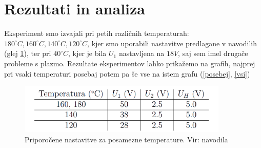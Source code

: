 \documentclass[10pt]{article}
\begin{document}
\section{Rezultati in analiza}

Eksperiment smo izvajali pri petih različnih temperaturah: $180^{\circ}C, 160^{\circ}C, 140^{\circ}C, 120^{\circ}C$, kjer smo uporabili nastavitve predlagane v navodilih (glej \ref{nastavitve}), ter pri $40^{\circ}C$, kjer je bila $U_1$ nastavljena na $18V$, saj sem imel drugače probleme s plazmo. Rezultate eksperimentov lahko prikažemo na grafih, najprej pri vsaki temperaturi posebaj potem pa še vse na istem grafu (\ref{posebej}, \ref{vsi})

\begin{figure}[h]
    \begin{center}
        \includegraphics[width=10cm]{nastavitve.png}
        \caption{Priporočene nastavitve za posamezne temperature. Vir: navodila}
        \label{nastavitve}
    \end{center}
\end{figure}
\end{document}
